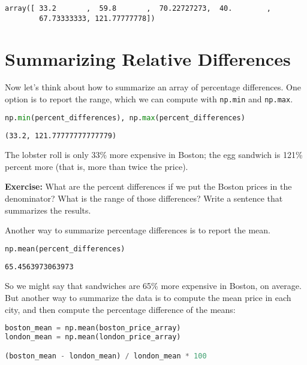 \begin{lstlisting}[style=output]
array([ 33.2       ,  59.8       ,  70.22727273,  40.        ,
        67.73333333, 121.77777778])
\end{lstlisting}

\section{Summarizing Relative
Differences}\label{summarizing-relative-differences}

Now let's think about how to summarize an array of percentage
differences. One option is to report the range, which we can compute
with \passthrough{\lstinline!np.min!} and
\passthrough{\lstinline!np.max!}.

\begin{lstlisting}[language=Python,style=source]
np.min(percent_differences), np.max(percent_differences)
\end{lstlisting}

\begin{lstlisting}[style=output]
(33.2, 121.77777777777779)
\end{lstlisting}

The lobster roll is only 33\% more expensive in Boston; the egg sandwich
is 121\% percent more (that is, more than twice the price).

\textbf{Exercise:} What are the percent differences if we put the Boston
prices in the denominator? What is the range of those differences? Write
a sentence that summarizes the results.

Another way to summarize percentage differences is to report the mean.

\begin{lstlisting}[language=Python,style=source]
np.mean(percent_differences)
\end{lstlisting}

\begin{lstlisting}[style=output]
65.4563973063973
\end{lstlisting}

So we might say that sandwiches are 65\% more expensive in Boston, on
average. But another way to summarize the data is to compute the mean
price in each city, and then compute the percentage difference of the
means:

\begin{lstlisting}[language=Python,style=source]
boston_mean = np.mean(boston_price_array)
london_mean = np.mean(london_price_array)

(boston_mean - london_mean) / london_mean * 100
\end{lstlisting}

